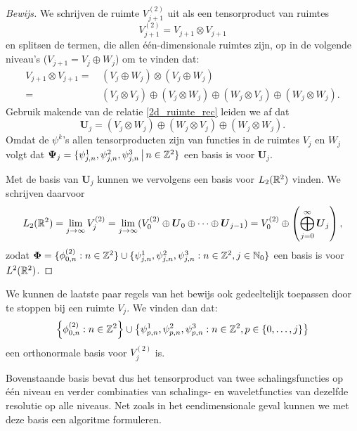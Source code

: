 \begin{proof}[Bewijs]
  We schrijven de ruimte $V_{j+1}^{(2)}$ uit als een tensorproduct van ruimtes
  \[
  V_{j+1}^{(2)} = V_{j+1} \otimes V_{j+1}
  \]
  en splitsen de termen, die allen \'e\'en-dimensionale ruimtes zijn, op in de volgende niveau's
  ($V_{j+1} = V_j \oplus W_j$) om te vinden dat:
  \begin{equation*}
  \begin{split}
    V_{j+1} \otimes V_{j+1} =&\, ( V_j \oplus W_j ) \otimes (V_j \oplus W_j ) \\ 
                            =&\, (V_j \otimes V_j) \oplus (V_j \otimes W_j) 
                        \oplus (W_j \otimes V_j) \oplus (W_j \otimes W_j).
  \end{split}
  \end{equation*}
  Gebruik makende van de relatie \eqref{2d_ruimte_rec} leiden we af dat 
  \[
    \boldsymbol{U}_j = (V_j \otimes W_j) \oplus (W_j \otimes V_j) \oplus (W_j \otimes W_j).
  \]
  Omdat de $\psi^k$'s allen tensorproducten zijn van functies in de ruimtes $V_j$ en $W_j$ volgt
  dat $\boldsymbol\Psi_j = \{ \psi^1_{j,n}, \psi^2_{j,n}, \psi^3_{j,n} \,\big|\,  n \in \mathbb{Z}^2 \}$ 
  een basis is voor $\boldsymbol{U}_j$.

  Met de basis van $\boldsymbol{U}_j$ kunnen we vervolgens een basis voor $L_2(\mathbb{R}^2)$ vinden. We schrijven daarvoor
  \[
  L_2(\mathbb{R}^2) = \lim_{j \to \infty} V_j^{(2)} = 
  \lim_{j \to \infty} ( V_0^{(2)} \oplus \boldsymbol{U}_0 \oplus \cdots \oplus \boldsymbol{U}_{j-1} ) = 
   V_0^{(2)} \oplus \left( \bigoplus_{j=0}^\infty \boldsymbol{U}_j \right),
  \]
  zodat
  $\boldsymbol{\Phi} = \{ \phi^{(2)}_{0, n}: n \in \mathbb{Z}^2 \} \cup \{ \psi^1_{j,n}, \psi^2_{j,n}, \psi^3_{j,n}: n \in \mathbb{Z}^2, j \in \mathbb{N}_0 \}$
  een basis is voor $L^2(\mathbb{R}^2)$.
\end{proof}
\begin{gevolg}
We kunnen de laatste paar regels van het bewijs ook gedeeltelijk toepassen door te stoppen bij een ruimte $V_j$.
We vinden dan dat: 
\[
\left\{ \phi^{(2)}_{0, n}: n \in \mathbb{Z}^2 \right\} \cup 
\left\{ \psi^1_{p,n}, \psi^2_{p,n}, \psi^3_{p,n}: n \in \mathbb{Z}^2, 
p \in \{0, \ldots, j \}  \right\}
\]
een orthonormale basis voor $V_j^{(2)}$ is.
\end{gevolg}

Bovenstaande basis bevat dus het tensorproduct van twee schalingsfuncties op \'e\'en niveau 
en verder combinaties van schalings- en waveletfuncties van dezelfde resolutie op alle niveaus. 
Net zoals in het eendimensionale geval kunnen we met deze basis een algoritme formuleren.

